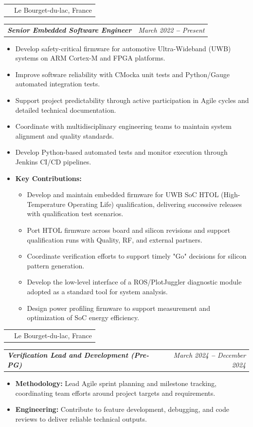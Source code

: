 \documentclass[letterpaper,11pt]{article}
\makeatletter
\def\vspaceAfterBullets{1pt} %
\def\bulletIndent{15pt} %
\newcommand{\bulletItem}[1]{
  \item\small{
    {#1}
  }
}
\newcommand{\companyNameAndLocationHeading}[2]{
  \item
    \begin{tabular*}{1.0\textwidth}[b]{l@{\extracolsep{\fill}}r}
      \textbf{#1} & #2
    \end{tabular*}
}
\newcommand{\titleAndDateHeading}[2]{
    \item
    \begin{tabular*}{1.0\textwidth}[b]{l@{\extracolsep{\fill}}r}
      {\bfseries\itshape\small #1} & \itshape\small #2
    \end{tabular*}
}
\newcommand{\outerBulletListStart}{\begin{itemize}[leftmargin=\bulletIndent]}
\newcommand{\outerBulletListEnd}{\end{itemize}\vspace{\vspaceAfterBullets}}
\newcommand{\bref}[2]{\href{#1}{\color{blue}{#2}}}
\makeatother
\begin{document}
\companyNameAndLocationHeading {\bref{https://www.st.com/}{STMicroelectronics}}{Le Bourget-du-lac, France}
\titleAndDateHeading
{Senior Embedded Software Engineer}{March 2022 \textbf{--} Present}
\outerBulletListStart
\bulletItem{Develop safety-critical firmware for automotive Ultra-Wideband (UWB) systems on ARM Cortex-M and FPGA platforms.}
\bulletItem{Improve software reliability with CMocka unit tests and Python/Gauge automated integration tests.}
\bulletItem{Support project predictability through active participation in Agile cycles and detailed technical documentation.}
\bulletItem{Coordinate with multidisciplinary engineering teams to maintain system alignment and quality standards.}
\bulletItem{Develop Python-based automated tests and monitor execution through Jenkins CI/CD pipelines.}
\bulletItem{\textbf{Key Contributions:}}
\begin{itemize}
  \item Develop and maintain embedded firmware for UWB SoC HTOL (High-Temperature Operating Life) qualification, delivering successive releases with qualification test scenarios.
  \item Port HTOL firmware across board and silicon revisions and support qualification runs with Quality, RF, and external partners.
  \item Coordinate verification efforts to support timely "Go" decisions for silicon pattern generation.
  \item Develop the low-level interface of a ROS/PlotJuggler diagnostic module adopted as a standard tool for system analysis.
  \item Design power profiling firmware to support measurement and optimization of SoC energy efficiency.
\end{itemize}
\outerBulletListEnd
\vspace{1em} %

\companyNameAndLocationHeading {\bref{https://www.st.com/}{STMicroelectronics}}{Le Bourget-du-lac, France}
\titleAndDateHeading
{Verification Lead and Development (Pre-PG)}{March 2024 \textbf{--} December 2024}
\outerBulletListStart
    \bulletItem{\textbf{Methodology:} Lead Agile sprint planning and milestone tracking, coordinating team efforts around project targets and requirements.}
    \bulletItem{\textbf{Engineering:} Contribute to feature development, debugging, and code reviews to deliver reliable technical outputs.}
\outerBulletListEnd
\end{document}
